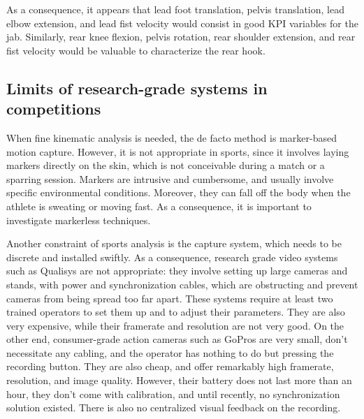 As a consequence, it appears that lead foot translation, pelvis translation, lead elbow extension, and lead fist velocity would consist in good KPI variables for the jab. Similarly, rear knee flexion, pelvis rotation, rear shoulder extension, and rear fist velocity would be valuable to characterize the rear hook. 

\newpage

\subsection{Limits of research-grade systems in competitions}

When fine kinematic analysis is needed, the de facto method is marker-based motion capture. However, it is not appropriate in sports, since it involves laying markers directly on the skin, which is not conceivable during a match or a sparring session. Markers are intrusive and cumbersome, and usually involve specific environmental conditions. Moreover, they can fall off the body when the athlete is sweating or moving fast. As a consequence, it is important to investigate markerless techniques. 

Another constraint of sports analysis is the capture system, which needs to be discrete and installed swiftly. As a consequence, research grade video systems such as Qualisys are not appropriate: they involve setting up large cameras and stands, with power and synchronization cables, which are obstructing and prevent cameras from being spread too far apart. These systems require at least two trained operators to set them up and to adjust their parameters. They are also very expensive, while their framerate and resolution are not very good. On the other end, consumer-grade action cameras such as GoPros are very small, don't necessitate any cabling, and the operator has nothing to do but pressing the recording button. They are also cheap, and offer remarkably high framerate, resolution, and image quality. However, their battery does not last more than an hour, they don't come with calibration, and until recently, no synchronization solution existed. There is also no centralized visual feedback on the recording.

